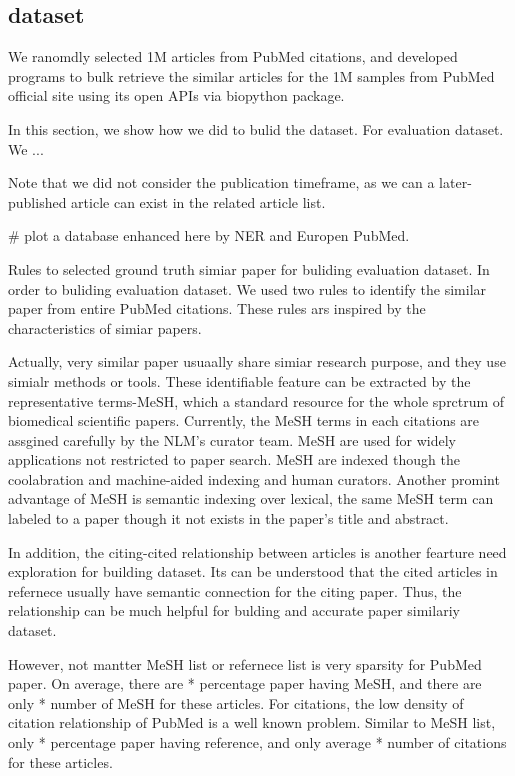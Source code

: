 \documentclass[11pt]{article}
\begin{document}
    \subsection{dataset}
    We ranomdly selected 1M articles from PubMed citations, and developed programs to bulk retrieve the similar articles for the 1M samples from PubMed official site using its open APIs via biopython \cite{10.1093/bioinformatics/btp163} package.

    In this section, we show how we did to bulid the dataset. For evaluation dataset. We ...

    Note that we did not consider the publication timeframe, as we can a later-published article can exist in the related article list.

    # plot a database enhanced here by NER and Europen PubMed.

    Rules to selected ground truth simiar paper for buliding evaluation dataset.
    In order to buliding evaluation dataset. We used two rules to identify the similar paper from entire PubMed citations. These rules ars inspired by the characteristics of simiar papers.

    Actually, very similar paper usuaally share simiar research purpose, and they use simialr methods or tools. These identifiable feature can be extracted by the representative terms-MeSH, which a standard resource for the whole sprctrum of biomedical scientific papers.
    Currently, the MeSH terms in each citations are assgined carefully by the NLM's curator team. MeSH are used for widely applications not restricted to paper search. MeSH are indexed though the coolabration and machine-aided indexing and human curators.
    Another promint advantage of MeSH is semantic indexing over lexical, the same MeSH term can labeled to a paper though it not exists in the paper's title and abstract.

    In addition, the citing-cited relationship between articles is another fearture need exploration for building dataset. Its can be understood that the cited articles in refernece usually have semantic connection for the citing paper.
    Thus, the relationship can be much helpful for bulding and accurate paper similariy dataset.

    However, not mantter MeSH list or refernece list is very sparsity for PubMed paper. On average, there are * percentage paper having MeSH, and there are only * number of MeSH for these articles.
    For citations, the low density of citation relationship of PubMed is a well known problem. Similar to MeSH list, only * percentage paper having reference, and only average * number of citations for these articles.
\end{document}
